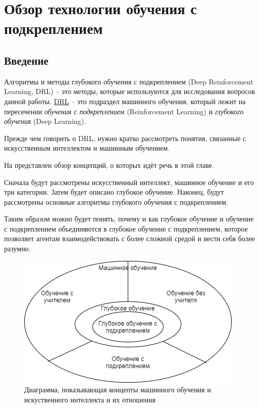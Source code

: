 \chapter{Обзор технологии обучения с подкреплением} \label{ch1}

\section{Введение} \label{ch1:intro}

Алгоритмы и методы глубокого обучения с подкреплением (Deep Reinforcement Learning, DRL) – это методы, которые используются для исследования вопросов данной работы. \hyperref[acr:drl]{DRL} – это подраздел машинного обучения, который лежит на пересечении \textit{обучения с подкреплением} (Reinforcement Learning) и \textit{глубокого обучения} (Deep Learning).

Прежде чем говорить о DRL, нужно кратко рассмотреть понятия, связанные с искусственным интеллектом и машинным обучением.

На  представлен обзор концепций, о которых идёт речь в этой главе. 

Сначала будут рассмотрены искусственный интеллект, машинное обучение и его три категории. Затем будет описано глубокое обучение. Наконец, будут рассмотрены основные алгоритмы глубокого обучения с подкреплением.

Таким образом можно будет понять, почему и как глубокое обучение и обучение с подкреплением объединяются в глубокое обучение с подкреплением, которое позволяет агентам взаимодействовать с более сложной средой и вести себя более разумно.

\begin{figure}[ht!] 
	\center
	\includegraphics [scale=0.80] {my_folder/images/ch1/ML-and-AI-concepts.png}
	\caption{Диаграмма, показывающая концепты машинного обучения и искуственного интеллекта и их отношения} 
	\label{fig:ch1-ML-and-AI-concepts}  
\end{figure}

